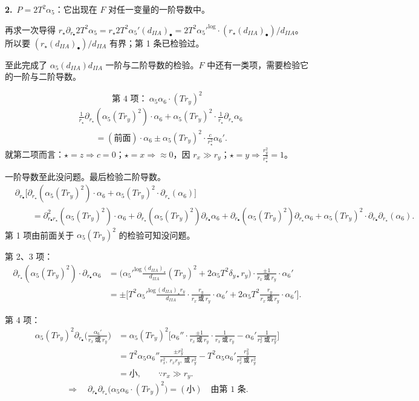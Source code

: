\medskip
\noindent\textbf{2.}\ $P=2T^2\alpha_5$：它出现在 $F$ 对任一变量的一阶导数中。

再求一次导得 $r_\star\partial_{r_\bullet}2T^2\alpha_5=r_\star2T^2\alpha_5'(d_{IIA})_\bullet=2T^2{\alpha_5'}^{\log}\cdot(r_\star(d_{IIA})_\bullet)/d_{IIA}$。所以要 $(r_\star(d_{IIA})_\bullet)/d_{IIA}$ 有界；第 1 条已检验过。

至此完成了 $\alpha_5(d_{IIA})d_{IIA}$ 一阶与二阶导数的检验。$F$ 中还有一类项，需要检验它的一阶与二阶导数。

\[
\text{第 4 项：}\ \alpha_5\alpha_6\cdot(Tr_y)^2
\]
\begin{align*}
&\frac{1}{r_\star}\partial_{r_\star}(\alpha_5(Tr_y)^2)\cdot\alpha_6+\alpha_5(Tr_y)^2\cdot\frac{1}{r_\star}\partial_{r_\star}\alpha_6\\
&\qquad=(\text{前面})\cdot\alpha_6\pm\alpha_5(Tr_y)^2\cdot\frac{c}{r_\star^2}\alpha_6'.
\end{align*}
就第二项而言：$\star=z\Longrightarrow c=0$；$\star=x\Longrightarrow\approx0$，因 $r_x\gg r_y$；$\star=y\Longrightarrow\frac{r_y^2}{r_\star^2}=1$。

一阶导数至此没问题。最后检验二阶导数。
\begin{align*}
&\partial_{r_\bullet}\big[\partial_{r_\star}(\alpha_5(Tr_y)^2)\cdot\alpha_6+\alpha_5(Tr_y)^2\cdot\partial_{r_\star}(\alpha_6)\big]\\
&\qquad=\partial^2_{r_\bullet r_\star}(\alpha_5(Tr_y)^2)\cdot\alpha_6+\partial_{r_\star}(\alpha_5(Tr_y)^2)\partial_{r_\bullet}\alpha_6
+\partial_{r_\bullet}(\alpha_5(Tr_y)^2)\partial_{r_\star}\alpha_6+\alpha_5(Tr_y)^2\cdot\partial_{r_\bullet}\partial_{r_\star}(\alpha_6).
\end{align*}
第 1 项由前面关于 $\alpha_5(Tr_y)^2$ 的检验可知没问题。

第 2、3 项：
\begin{align*}
\partial_{r_\star}(\alpha_5(Tr_y)^2)\cdot\partial_{r_\bullet}\alpha_6
&=\Big({\alpha_5'}^{\log}\frac{(d_{IIA})_\star}{d_{IIA}}(Tr_y)^2+2\alpha_5T^2\delta_{y\star}r_y\Big)\cdot\frac{\pm1}{r_x\ \text{或}\ r_y}\cdot\alpha_6'\\
&=\pm\Big[T^2{\alpha_5'}^{\log}\frac{(d_{IIA})_\star r_y}{d_{IIA}}\cdot\frac{r_y}{r_x\ \text{或}\ r_y}\cdot\alpha_6'
+2\alpha_5T^2\frac{r_y}{r_x\ \text{或}\ r_y}\cdot\alpha_6'\Big].
\end{align*}

第 4 项：
\begin{align*}
\alpha_5(Tr_y)^2\partial_{r_\bullet}\Big(\frac{\alpha_6'}{r_x\ \text{或}\ r_y}\Big)
&=\alpha_5(Tr_y)^2\Big[\alpha_6''\cdot\frac{\pm1}{r_x\ \text{或}\ r_y}\cdot\frac{1}{r_x\ \text{或}\ r_y}
-\alpha_6'\frac{1}{r_x^2\ \text{或}\ r_y^2}\Big]\\
&=T^2\alpha_5\alpha_6''\frac{\pm r_y^2}{r_x^2,\ r_xr_y,\ \text{或}\ r_y^2}
-T^2\alpha_5\alpha_6'\frac{r_y^2}{r_x^2\ \text{或}\ r_y^2}\\
&=\text{小},\qquad\because r_x\gg r_y.
\end{align*}
\[
\Longrightarrow\quad\partial_{r_\bullet}\partial_{r_\star}\big(\alpha_5\alpha_6\cdot(Tr_y)^2\big)=(\text{小})\quad\text{由第 1 条}.
\]

